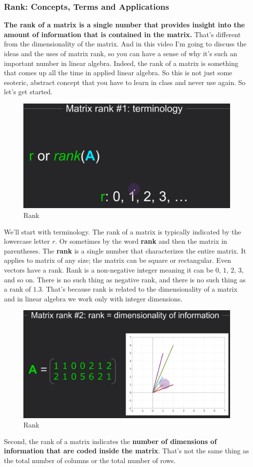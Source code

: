 \documentclass[fleqn,10pt]{olplainarticle}
\theoremstyle{definition}
\theoremstyle{remark}
\begin{document}
\subsubsection*{Rank: Concepts, Terms and Applications}

\textbf{The rank of a matrix is a single number that provides insight into the amount of information that is contained in the matrix.} That's different from the dimensionality of the matrix. And in this video I'm going to discuss the ideas and the uses of matrix rank, so you can have a sense of why it's such an important number in linear algebra. Indeed, the rank of a matrix is something that comes up all the time in applied linear algebra. So this is not just some esoteric, abstract concept that you have to learn in class and never use again. So let's get started.

\begin{figure}[ht]
	\centering
	\includegraphics[width=0.2\linewidth]{images/rank-01.png}
	\caption{Rank}
	\label{fig:rank_01}
\end{figure}

We'll start with terminology. The rank of a matrix is typically indicated by the lowercase letter $r$. Or sometimes by the word \textbf{rank }and then the matrix in parentheses. The \textbf{rank }is a single number that characterizes the entire matrix. It applies to matrix of any size; the matrix can be square or rectangular. Even vectors have a rank. Rank is a non-negative integer meaning it can be $0$, $1$, $2$, $3$, and so on. There is no such thing as negative rank, and there is no such thing as a rank of $1.3$. That's because rank is related to the dimensionality of a matrix and in linear algebra we work only with integer dimensions.

\begin{figure}[ht]
	\centering
	\includegraphics[width=0.4\linewidth]{images/rank-02.png}
	\caption{Rank}
	\label{fig:rank_02}
\end{figure}

Second, the rank of a matrix indicates the \textbf{number of dimensions of information that are coded inside the matrix}. That's not the same thing as the total number of columns or the total number of rows.
\end{document}
